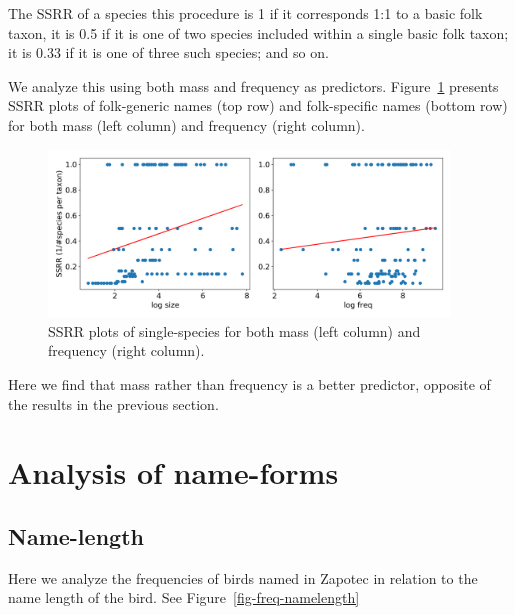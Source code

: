 \documentclass[10pt,letterpaper]{article}
\begin{document}
The SSRR of a species this procedure is 1 if it corresponds 1:1 to a basic folk taxon, it is 0.5 if it is one of two species included within a single basic folk taxon; it is 0.33 if it is one of three such species; and so on.

We analyze this using both mass and frequency as predictors. Figure~\ref{fig-ssrr} presents SSRR plots of folk-generic names (top row) and folk-specific names (bottom row) for both mass (left column) and frequency (right column).

\begin{figure}[t!]
  \begin{center}
    \includegraphics[width=0.95\textwidth]{./figures/ssrr-singlespecies.png}
        \caption{SSRR plots of single-species for both mass (left column) and frequency (right column).}
        \label{fig-ssrr}
  \end{center}
\end{figure}

Here we find that mass rather than frequency is a better predictor, opposite of the results in the previous section.





\section{Analysis of name-forms}

\subsection{Name-length}
Here we analyze the frequencies of birds named in Zapotec in relation to the name length of the bird. See Figure~\ref{fig-freq-namelength}
\end{document}
